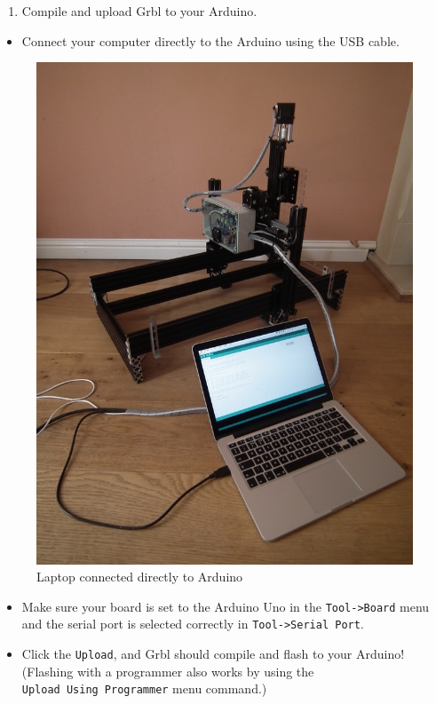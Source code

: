 \documentclass[]{book}
\providecommand{\tightlist}{%
  \setlength{\itemsep}{0pt}\setlength{\parskip}{0pt}}
\theoremstyle{definition}
\theoremstyle{definition}
\theoremstyle{remark}
\begin{document}
\begin{enumerate}
\def\labelenumi{\arabic{enumi}.}
\setcounter{enumi}{4}
\tightlist
\item
  Compile and upload Grbl to your Arduino.
\end{enumerate}

\begin{itemize}
\tightlist
\item
  Connect your computer directly to the Arduino using the USB cable.
\end{itemize}

\begin{figure}

{\centering \includegraphics[width=0.75\linewidth]{images/laptop_connected_to_arduino} 

}

\caption{Laptop connected directly to Arduino}\label{fig:laptop2arduino}
\end{figure}

\begin{itemize}
\tightlist
\item
  Make sure your board is set to the Arduino Uno in the
  \texttt{Tool-\textgreater{}Board} menu and the serial port is selected
  correctly in \texttt{Tool-\textgreater{}Serial\ Port}.
\item
  Click the \texttt{Upload}, and Grbl should compile and flash to your
  Arduino! (Flashing with a programmer also works by using the
  \texttt{Upload\ Using\ Programmer} menu command.)
\end{itemize}
\end{document}
